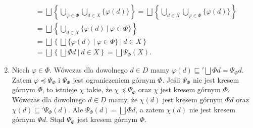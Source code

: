 \begin{dowod}
\begin{enumerate}
\begin{align*}
                        &= \bigsqcup \left\{\bigcup\limits_{\varphi\in\Phi}\bigcup\limits_{d\in X}\{\varphi(d)\}\right\}
                         =\bigsqcup \left\{\bigcup\limits_{d\in X}\bigcup\limits_{\varphi\in\Phi}\{\varphi(d)\}\right\}\\
                        &= \bigsqcup \left\{\bigcup\limits_{d\in X}\{\varphi(d)\ |\ \varphi\in\Phi \}\right\}\\
                        &= \bigsqcup \left\{\bigsqcup \{\varphi(d)\ |\ \varphi\in\Phi \}\ |\ d\in X\right\}\\
                        &= \bigsqcup \left\{\bigsqcup \Phi d\ |\ d\in X\right\}
                        = \bigsqcup \Psi_\Phi(X).
          \end{align*}
        \item Niech \(\varphi\in\Phi\). Wówczas dla dowolnego \(d\in D\) mamy \(\varphi(d)\sqsubseteq' \bigsqcup \Phi d = \Psi_{\Phi} d\). Zatem \(\varphi\preceq\Psi_\Phi\) i \(\Psi_\Phi\) jest ograniczeniem górnym \(\Phi\). Jeśli \(\Psi_\Phi\) nie jest kresem górnym \(\Phi\), to istnieje \(\chi\) takie, że \(\chi\preceq\Psi_\Phi\) oraz \(\chi\) jest kresem górnym \(\Phi\). Wówczas dla dowolnego \(d\in D\) mamy, że \(\chi(d)\) jest kresem górnym \(\Phi d\) oraz \(\chi(d)\sqsubseteq'\Psi_\Phi(d)\). Ale \(\Psi_\Phi(d)=\bigsqcup\Phi d\), a zatem \(\chi(d)\) nie jest kresem górnym \(\Phi d\). Stąd \(\Psi_\Phi\) jest kresem górnym \(\Phi\).   

      \end{enumerate}
\end{dowod}
